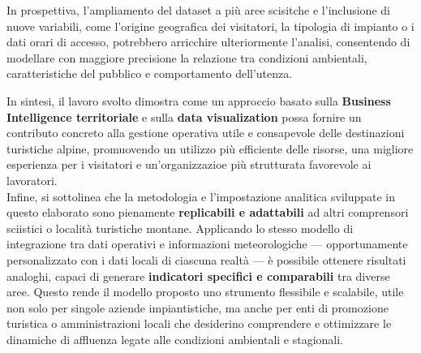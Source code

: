 In prospettiva, l’ampliamento del dataset a più aree scisitche  e l’inclusione di nuove variabili, come l’origine geografica dei visitatori, la tipologia di impianto o i dati orari di accesso,  potrebbero arricchire ulteriormente l’analisi, consentendo di modellare con maggiore precisione la relazione tra condizioni ambientali, caratteristiche del pubblico e comportamento dell’utenza.  

In sintesi, il lavoro svolto dimostra come un approccio basato sulla \textbf{Business Intelligence territoriale} e sulla \textbf{data visualization} possa fornire un contributo concreto alla gestione operativa utile e consapevole delle destinazioni turistiche alpine, promuovendo un utilizzo più efficiente delle risorse, una migliore esperienza per i visitatori e un'organizzazioe più strutturata favorevole ai lavoratori. \\ 

Infine, si sottolinea che la metodologia e l’impostazione analitica sviluppate in questo elaborato sono pienamente \textbf{replicabili e adattabili} ad altri comprensori sciistici o località turistiche montane.  
Applicando lo stesso modello di integrazione tra dati operativi e informazioni meteorologiche — opportunamente personalizzato con i dati locali di ciascuna realtà — è possibile ottenere risultati analoghi, capaci di generare \textbf{indicatori specifici e comparabili} tra diverse aree.  
Questo rende il modello proposto uno strumento flessibile e scalabile, utile non solo per singole aziende impiantistiche, ma anche per enti di promozione turistica o amministrazioni locali che desiderino comprendere e ottimizzare le dinamiche di affluenza legate alle condizioni ambientali e stagionali.


